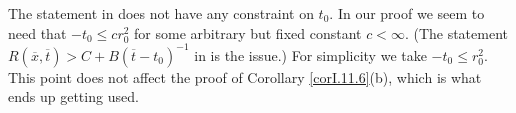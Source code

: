 \begin{remark}
  \label{rem:kl-curvature-bounds-ricci-flow-solutions-nonnegative-curvature-operator-ass-structural-remark-curvature-operators}

The statement in \cite[Corollary 11.6(a)]{Perelman}
does not have any constraint on $t_0$.
In our proof we seem to need that $-t_0 \le c r_0^2$ for some arbitrary
but fixed
constant $c < \infty$.
(The statement $R(\overline{x}, \overline{t}) >
C + B (\overline{t} - t_0)^{-1}$ in
\cite[Proof of Corollary 11.6(a)]{Perelman} is the issue.)
For simplicity we take
$- t_0 \le r_0^2$. This point does not affect the proof of
Corollary \ref{corI.11.6}(b), which is what ends up getting used.
\end{remark}
